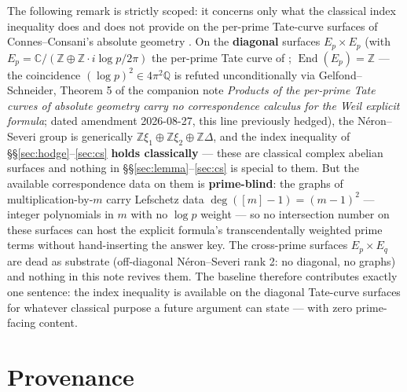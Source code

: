 \documentclass[11pt]{article}
\theoremstyle{definition}
\theoremstyle{remark}
\newcommand{\End}{\operatorname{End}}
\begin{document}
The following remark is strictly scoped: it concerns only what the classical index
inequality does and does not provide on the per-prime Tate-curve surfaces of
Connes--Consani's absolute geometry \cite{ConnesConsani}. On the \textbf{diagonal} surfaces
$E_p \times E_p$ (with $E_p = \mathbb{C} / (\mathbb{Z} \oplus \mathbb{Z} \cdot i \log p /
2\pi)$ the per-prime Tate curve of \cite{ConnesConsani}; $\End(E_p) = \mathbb{Z}$ --- the coincidence $(\log p)^2 \in 4\pi^2 \mathbb{Q}$ is refuted unconditionally via Gelfond--Schneider, Theorem 5 of the companion note \emph{Products of the per-prime Tate curves of absolute geometry carry no correspondence calculus for the Weil explicit formula}; dated amendment 2026-08-27, this line previously hedged), the N\'eron--Severi group is
generically $\mathbb{Z}\xi_1 \oplus \mathbb{Z}\xi_2 \oplus \mathbb{Z}\Delta$, and the index
inequality of \S\S\ref{sec:hodge}--\ref{sec:cs} \textbf{holds classically} --- these are
classical complex abelian surfaces and nothing in
\S\S\ref{sec:lemma}--\ref{sec:cs} is special to them. But the available correspondence data
on them is \textbf{prime-blind}: the graphs of multiplication-by-$m$ carry Lefschetz data
$\deg([m] - 1) = (m - 1)^2$ --- integer polynomials in $m$ with no $\log p$ weight --- so no
intersection number on these surfaces can host the explicit formula's transcendentally
weighted prime terms without hand-inserting the answer key. The cross-prime surfaces
$E_p \times E_q$ are dead as substrate (off-diagonal N\'eron--Severi rank 2: no diagonal, no
graphs) and nothing in this note revives them. The baseline therefore contributes exactly
one sentence: the index inequality is available on the diagonal Tate-curve surfaces for
whatever classical purpose a future argument can state --- with zero prime-facing content.

\section*{Provenance}
\end{document}
